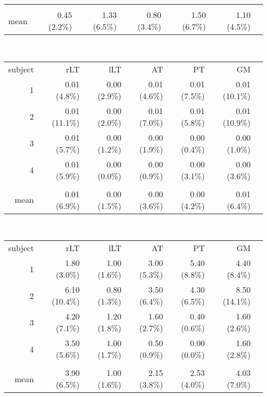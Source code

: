 \begin{table}
{\begin{minipage}{\linewidth}
\begin{tabular}{rrrrrrr}
                  &       &       &       &       &       \\
            mean  & 0.45 (2.2\%) & 1.33 (6.5\%) & 0.80 (3.4\%) & 1.50 (6.7\%) & 1.10 (4.5\%) \\
            \bottomrule
            \end{tabular}%
			\\[0.5ex]
            \begin{tabular}{rrrrrrr}
            \addlinespace
			\multicolumn{6}{c}{\textbf{P0$_{z}$}}\\
			\toprule
            subject & rLT   & lLT   & AT    & PT    & GM   \\
            \midrule
            1     & 0.01 (4.8\%) & 0.00 (2.9\%) & 0.01 (4.6\%) & 0.01 (7.5\%) & 0.01 (10.1\%)\\
            2     & 0.01 (11.1\%) & 0.00 (2.0\%) & 0.01 (7.0\%) & 0.01 (5.8\%) & 0.01 (10.9\%) \\
            3     & 0.01 (5.7\%) & 0.00 (1.2\%) & 0.00 (1.9\%) & 0.00 (0.4\%) & 0.00 (1.0\%)  \\
            4     & 0.01 (5.9\%) & 0.00 (0.0\%) & 0.00 (0.9\%) & 0.00 (3.1\%) & 0.00 (3.6\%) \\
                  &       &       &       &       &       \\
            mean  & 0.01 (6.9\%) & 0.00 (1.5\%) & 0.00 (3.6\%) & 0.00 (4.2\%) & 0.01 (6.4\%)  \\
            \bottomrule
            \end{tabular}%
			\\[0.5ex]
            \begin{tabular}{rrrrrrr}
	        \addlinespace
			\multicolumn{6}{c}{\textbf{FWHM$_{z}$}}\\			
	        \toprule
            subject & rLT   & lLT   & AT    & PT    & GM  \\
            \midrule
            1     & 1.80 (3.0\%) & 1.00 (1.6\%) & 3.00 (5.3\%) & 5.40 (8.8\%) & 4.40 (8.4\%) \\
            2     & 6.10 (10.4\%) & 0.80 (1.3\%) & 3.50 (6.4\%) & 4.30 (6.5\%) & 8.50 (14.1\%) \\
            3     & 4.20 (7.1\%) & 1.20 (1.8\%) & 1.60 (2.7\%) & 0.40 (0.6\%) & 1.60 (2.6\%) \\
            4     & 3.50 (5.6\%) & 1.00 (1.7\%) & 0.50 (0.9\%) & 0.00 (0.0\%) & 1.60 (2.8\%) \\
                  &       &       &       &       &   & \\
            mean  & 3.90 (6.5\%) & 1.00 (1.6\%) & 2.15 (3.8\%) & 2.53 (4.0\%) & 4.03 (7.0\%) \\
            \bottomrule
            \end{tabular}%
			\end{minipage}
			\label{tab:chapter6 scan rescan qsi}
        }
\label{tab:chapter6 scan rescan}
\end{table}
